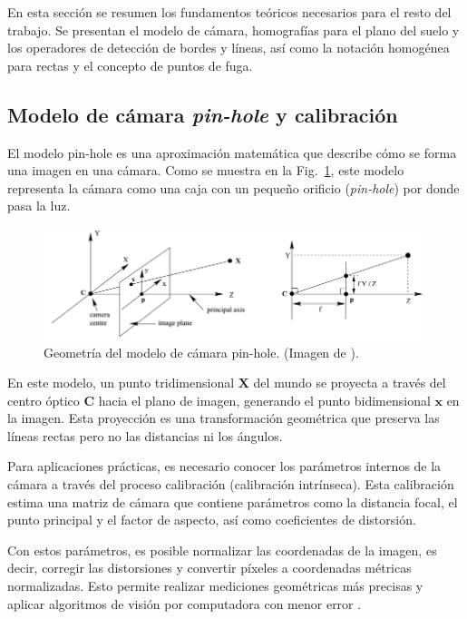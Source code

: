 En esta sección se resumen los fundamentos teóricos necesarios para el resto del trabajo. Se presentan el modelo de cámara, homografías para el plano del suelo y los operadores de detección de bordes y líneas, así como la notación homogénea para rectas y el concepto de puntos de fuga.

\subsection{Modelo de cámara \emph{pin-hole} y calibración}\label{subsec:camera}

El modelo pin-hole es una aproximación matemática que describe cómo se forma una imagen
en una cámara. Como se muestra en la Fig.~\ref{fig:pinhole-model}, este modelo representa
la cámara como una caja con un pequeño orificio (\emph{pin-hole}) por donde pasa la luz.

\begin{figure}[!ht]
	\centering
	\includegraphics[width=0.99\textwidth]{img/2-mt/pinhole.png}
	\caption{Geometría del modelo de cámara pin-hole. (Imagen de \cite{hartley2003multiple}).}
	\label{fig:pinhole-model}
\end{figure}


En este modelo, un punto tridimensional \(\mathbf{X}\) del mundo se proyecta a través
del centro óptico \(\mathbf{C}\) hacia el plano de imagen, generando el punto bidimensional
\(\mathbf{x}\) en la imagen. Esta proyección es una transformación geométrica que preserva
las líneas rectas pero no las distancias ni los ángulos.


Para aplicaciones prácticas, es necesario conocer los parámetros internos de la cámara
a través del proceso calibración (calibración intrínseca). Esta calibración estima
una matriz de cámara que contiene parámetros como la distancia focal,
el punto principal y el factor de aspecto, así como coeficientes de distorsión.


Con estos parámetros, es posible normalizar las coordenadas de la imagen,
es decir, corregir las distorsiones y convertir píxeles a coordenadas métricas normalizadas.
Esto permite realizar mediciones geométricas más precisas y aplicar algoritmos
de visión por computadora con menor error \cite{hartley2003multiple}.

